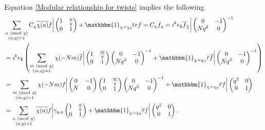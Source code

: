 \documentclass[a4paper,12.5pt]{amsart}
\theoremstyle{definition}
\theoremstyle{remark}
\newcommand{\ind}{\mathbbm{1}_{ \chi= \chi_0}}
\newcommand{\Mod}[1]{\ (\mathrm{mod}\ #1)}
\begin{document}
                    Equation \eqref{Modular relationship for twists}  implies the following.  
                \begin{align}{\label{Modularity on average}}
                & \sum_{ \substack{ a \Mod{q}  \\ (a,q)=1       } } C_{\chi} \overline{\chi(a)} 
 f \bigg |  \begin{pmatrix}
 1 & \frac{a}{q} \\
0 & 1    
                \end{pmatrix} + \mathbbm{1} _{\chi= \chi_0} \overline{ \epsilon} rf = C_{\chi} f_{\chi} = i^k \epsilon_{\bold{1}} \overline{f}_{\overline{\chi}} \bigg| \begin{pmatrix}
 0 & -1 \\
Nq^2 & 0   
\end{pmatrix}^{-1}  \nonumber \\
&= i^k \epsilon_{\bold{1}} \left(        \sum_{ \substack{ m \Mod q  \\ (m,q)=1       } }  \chi(-Nm) \overline{f}   \bigg|  \begin{pmatrix}
 1 & \frac{m}{q} \\
0 & 1   
\end{pmatrix}         \begin{pmatrix}
 0 & -1 \\
Nq^2 & 0   
\end{pmatrix}^{-1}     +   \mathbbm{1}_{ \chi= \chi_0} \overline{r} \overline{f}   \bigg|  \begin{pmatrix}
 0 & -1 \\
Nq^2 & 0   
\end{pmatrix}^{-1}    \right)   \nonumber   \\
&= \sum_{ \substack{ m \Mod q  \\ (m,q)=1       } } \chi(-Nm) f\bigg| 
\begin{pmatrix}
 0 & -1 \\
 N & 0 
\end{pmatrix}
\begin{pmatrix}
 1 & \frac{m}{q} \\
0 & 1   
\end{pmatrix}         \begin{pmatrix}
 0 & -1 \\
Nq^2 & 0   
\end{pmatrix}^{-1}     + \ind \overline{r} f \bigg |  \begin{pmatrix}
 q^2 & 0 \\
0 & 1    
                \end{pmatrix} \nonumber \\ 
&= \sum_{ \substack{ a \Mod q  \\ (a,q)=1       } } \overline{\chi(a)} f\bigg|  \gamma_{q,a} \begin{pmatrix}
 1 & \frac{a}{q} \\
0 & 1    
                \end{pmatrix} + \ind \overline{r} f \bigg |  \begin{pmatrix}
 q^2 & 0 \\
0 & 1    
                \end{pmatrix}  .
                \end{align}
\end{document}
